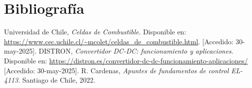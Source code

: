 \section{Bibliografía}



\begin{references}
    Universidad de Chile, \textit{Celdas de Combustible}. 
    Disponible en: \url{https://www.cec.uchile.cl/~mcolet/celdas_de_combustible.html}. [Accedido: 30-may-2025].
    DISTRON, \textit{Convertidor DC-DC: funcionamiento y aplicaciones}. 
    Disponible en: \url{https://distron.es/convertidor-dc-dc-funcionamiento-aplicaciones/} [Accedido: 30-may-2025].
    R. Cardenas, \textit{Apuntes de fundamentos de control EL-4113.}
    Santiago de Chile, 2022.
\end{references}


